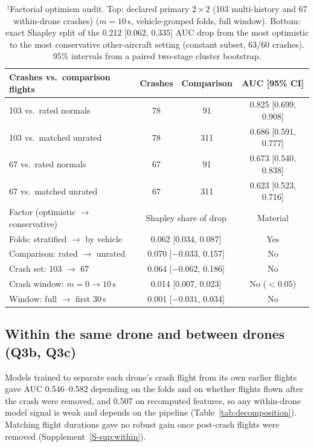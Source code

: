 \documentclass[preprint,12pt]{elsarticle}
\begin{document}
\begin{table}[t]
\centering
\caption{$^\dagger$Factorial optimism audit. Top: declared primary $2\times2$ (103 multi-history and 67 within-drone crashes) ($m=10$\,s, vehicle-grouped folds, full window). Bottom: exact Shapley split of the 0.212 [0.062, 0.335] AUC drop from the most optimistic to the most conservative other-aircraft setting (constant subset, 63/60 crashes). 95\% intervals from a paired two-stage cluster bootstrap.}
\label{tab:factorial}
\small
\begin{tabularx}{\textwidth}{@{}X c c c@{}}
\toprule
Crashes vs.\ comparison flights & Crashes & Comparison & AUC [95\% CI] \\
\midrule
103 vs.\ rated normals & 78 & 91 & 0.825 [0.699, 0.908] \\
103 vs.\ matched unrated & 78 & 311 & 0.686 [0.591, 0.777] \\
67 vs.\ rated normals & 67 & 91 & 0.673 [0.540, 0.838] \\
67 vs.\ matched unrated & 67 & 311 & 0.623 [0.523, 0.716] \\
\midrule
Factor (optimistic $\to$ conservative) & \multicolumn{2}{c}{Shapley share of drop} & Material \\
\midrule
Folds: stratified $\to$ by vehicle & \multicolumn{2}{c}{0.062 [0.034, 0.087]} & Yes \\
Comparison: rated $\to$ unrated & \multicolumn{2}{c}{0.070 [$-0.033$, 0.157]} & No \\
Crash set: 103 $\to$ 67 & \multicolumn{2}{c}{0.064 [$-0.062$, 0.186]} & No \\
Crash window: $m=0 \to 10$\,s & \multicolumn{2}{c}{0.014 [0.007, 0.023]} & No ($<0.05$) \\
Window: full $\to$ first 30\,s & \multicolumn{2}{c}{0.001 [$-0.031$, 0.034]} & No \\
\bottomrule
\end{tabularx}
\end{table}

\FloatBarrier
\subsection{Within the same drone and between drones (Q3b, Q3c)}
\label{sec:vibration}
Models trained to separate each drone's crash flight from its own earlier flights gave AUC 0.546--0.582 depending on the folds and on whether flights flown after the crash were removed, and 0.507 on recomputed features, so any within-drone model signal is weak and depends on the pipeline (Table~\ref{tab:decomposition}). Matching flight durations gave no robust gain once post-crash flights were removed (Supplement~\ref{S-sup:within}).
\end{document}

